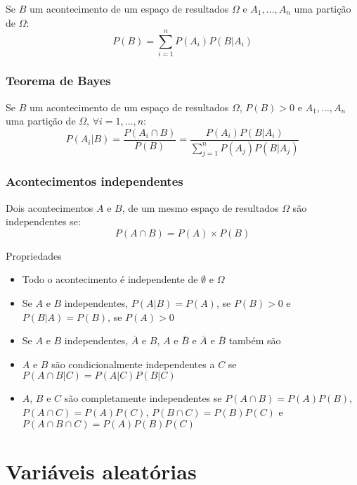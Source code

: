 \documentclass{article}
\begin{document}
\noindent Se $B$ um acontecimento de um espaço de resultados $\Omega$ e $A_1, \dots, A_n$ uma partição de $\Omega$:
$$ P(B) = \sum_{i=1}^n P(A_i)P(B|A_i) $$

\subsubsection*{Teorema de Bayes}

Se $B$ um acontecimento de um espaço de resultados $\Omega$, $P(B) > 0$ e $A_1, \dots, A_n$ uma partição de $\Omega$, $\forall i = 1, \dots, n$:
$$ P(A_i|B) = \frac{P(A_i \cap B)}{P(B)} = \frac{P(A_i)P(B|A_i)}{\sum_{j=1}^{n} P(A_j)P(B|A_j)} $$

\subsubsection*{Acontecimentos independentes}

Dois acontecimentos $A$ e $B$, de um mesmo espaço de resultados $\Omega$ são independentes se:
$$ P(A \cap B) = P(A) \times P(B) $$

\noindent Propriedades

\begin{itemize}
    \item Todo o acontecimento é independente de $\emptyset$ e $\Omega$
    \item Se $A$ e $B$ independentes, $P(A|B) = P(A)$, se $P(B) > 0$ e $P(B|A) = P(B)$, se $P(A) > 0$
    \item Se $A$ e $B$ independentes, $\bar{A}$ e $B$, $A$ e $\bar{B}$ e $\bar{A}$ e $\bar{B}$ também são
    \item $A$ e $B$ são condicionalmente independentes a $C$ se $P(A \cap B|C) = P(A|C)P(B|C)$
    \item $A$, $B$ e $C$ são completamente independentes se $P(A \cap B) = P(A)P(B)$, $P(A \cap C) = P(A)P(C)$, $P(B \cap C) = P(B)P(C)$ e $P(A \cap B \cap C) = P(A)P(B)P(C)$
\end{itemize}

\section{Variáveis aleatórias}
\end{document}
